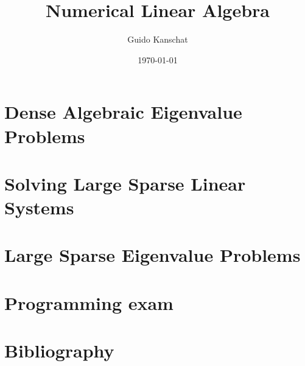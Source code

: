 \documentclass[notheorems,hidelinks,aspectratio=1610]{beamer}
\title{Numerical Linear Algebra}
\author{Guido Kanschat}
\date{\today}
\begin{document}
\frame{\maketitle}



\section{Dense Algebraic Eigenvalue Problems}
\frame{\sectoc}





\section{Solving Large Sparse Linear Systems}
\frame{\sectoc}








\section{Large Sparse Eigenvalue Problems}
\frame{\sectoc}





\section{Programming exam}
\frame{\sectoc}



\section*{Bibliography}
\frame{
}

\end{document}
